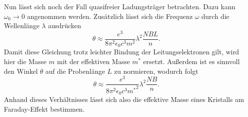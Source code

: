 Nun lässt sich noch der Fall quasifreier Ladungsträger betrachten. Dazu kann $\omega_0 \to 0$ angenommen werden. Zusätzlich lässt sich die Frequenz $\omega$ durch die Wellenlänge $\lambda$ ausdrücken
\begin{equation}
    \theta \approx \frac{e^3}{8 \pi^2 \epsilon_0 c^3 m^2} \lambda^2 \frac{NBL}{n}.
\end{equation}
Damit diese Gleichung trotz leichter Bindung der Leitungselektronen gilt, wird hier die Masse $m$ mit der effektiven Masse $m^*$ ersetzt. Außerdem ist es sinnvoll
den Winkel $\theta$ auf die Probenlänge $L$ zu normieren, wodurch folgt
\begin{equation}
    \theta \approx \frac{e^3}{8 \pi^2 \epsilon_0 c^3 {m^*}^2} \lambda^2 \frac{NB}{n}.
\end{equation}
Anhand dieses Verhältnisses lässt sich also die effektive Masse eines Kristalls am Faraday-Effekt bestimmen.